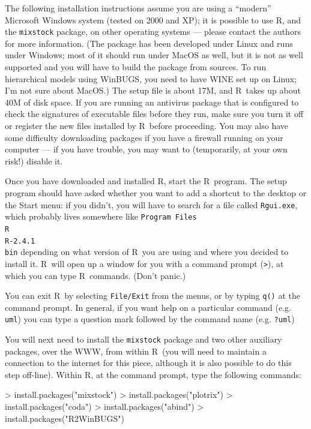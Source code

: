 \documentclass[11pt]{article}
\newcommand{\R}{{\sf R}}
\newcommand{\Rver}{2.4.1}
\begin{document}
The following installation instructions assume
you are using a ``modern'' Microsoft Windows system
(tested on 2000 and XP); it is possible to use
\R, and the {\tt mixstock} package, on other
operating systems --- please contact the
authors for more information. 
(The package has been developed under Linux and runs under
Windows; most of it should run under MacOS as well, but
it is not as well supported and you will have to build
the package from sources.   To run hierarchical models using
WinBUGS, you need to have WINE set up on Linux; I'm not
sure about MacOS.)
The setup file is about 17M, and 
\R\ takes up about 40M of disk space.
If you are running an antivirus package that is configured to check
the signatures of executable files before they run, make sure you turn
it off or register the new files installed by \R\ before proceeding.
You may also have some difficulty downloading packages if you have
a firewall running on your computer --- if you have trouble,
you may want to (temporarily, at your own risk!) disable it.

Once you have downloaded and installed \R,
start the \R\ program.  The setup program
should have asked whether you want to add a shortcut
to the desktop or the Start menu: if
you didn't, you will have to search for a file
called {\tt Rgui.exe}, which probably lives somewhere
like {\tt Program Files\\R\\R-\Rver\\bin} depending
on what version of \R\ you are using and where
you decided to install it.
\R\ will open up a window for you with a command
prompt ({\verb+>+}), at which you can type
\R\ commands.  (Don't panic.)

You can exit \R\ by selecting {\tt File/Exit} from
the menus, or by typing {\tt q()} at the command prompt.
In general, if you want help on a particular command
(e.g. {\tt uml}) you can type a question mark
followed by the command name (e.g. {\tt ?uml})

You will next need to install the {\tt mixstock}
package and two other auxiliary packages, over
the WWW, from within \R\ (you will need to
maintain a connection to the internet for this
piece, although it is also possible to do
this step off-line).
Within \R, at the command prompt, type the
following commands:
\begin{Schunk}
\begin{Sinput}
> install.packages("mixstock")
> install.packages("plotrix")
> install.packages("coda")
> install.packages("abind")
> install.packages("R2WinBUGS")
\end{Sinput}
\end{Schunk}
\end{document}
